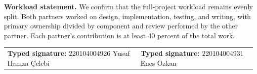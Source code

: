 \documentclass[10pt,a4paper]{article}
\begin{document}
\vspace{5pt}
\textbf{Workload statement.} We confirm that the full-project workload remains evenly split. Both partners worked on design, implementation, testing, and writing, with primary ownership divided by component and review performed by the other partner. Each partner's contribution is at least 40 percent of the total work.

\vspace{8pt}
\begin{tabularx}{\textwidth}{@{}X X@{}}
\textbf{Typed signature:} 220104004926 Yusuf Hamza Çelebi &
\textbf{Typed signature:} 220104004931 Enes Özkan \\
\end{tabularx}
\end{document}
